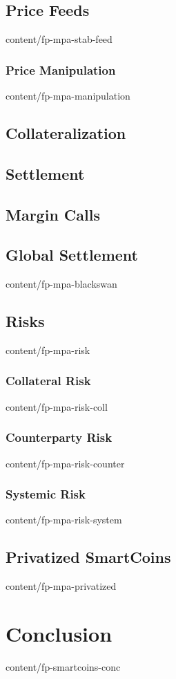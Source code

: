 \documentclass{btswhitepaper}
\begin{document}
\subsection    { Price Feeds                                      }  { content/fp-mpa-stab-feed          } 
\subsubsection { Price Manipulation                               }  { content/fp-mpa-manipulation       } 
\subsection    { Collateralization                                } 
\subsection    { Settlement                                       } 
\subsection    { Margin Calls                                     } 
\subsection    { Global Settlement                                }  { content/fp-mpa-blackswan          } 

\subsection    { Risks                                            }  { content/fp-mpa-risk               } 
\subsubsection { Collateral Risk                                  }  { content/fp-mpa-risk-coll          } 
\subsubsection { Counterparty Risk                                }  { content/fp-mpa-risk-counter       } 
\subsubsection { Systemic Risk                                    }  { content/fp-mpa-risk-system        } 
\subsection    { Privatized SmartCoins                            }  { content/fp-mpa-privatized         } 


\section        { Conclusion                                       }  { content/fp-smartcoins-conc     }


\end{document}

